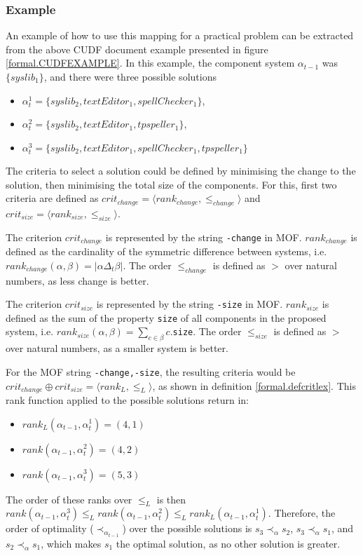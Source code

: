 \subsubsection{Example}
An example of how to use this mapping for a practical problem can be extracted from the above CUDF document example presented in figure \ref{formal.CUDFEXAMPLE}.
In this example, the component system $\alpha_{t-1}$ was  $\{syslib_1\}$, and there were three possible solutions
\begin{itemize}
  \item $\alpha_t^1 = \{syslib_2, textEditor_1, spellChecker_1\}$,
  \item $\alpha_t^2 = \{syslib_2, textEditor_1, tpspeller_1\}$,
  \item $\alpha_t^3 = \{syslib_2, textEditor_1, spellChecker_1, tpspeller_1\}$
\end{itemize}

The criteria to select a solution could be defined by minimising the change to the solution, then minimising the total size of the components.
For this, first two criteria are defined as $crit_{change} = \langle rank_{change}, \leq_{change} \rangle$ and $crit_{size} = \langle rank_{size}, \leq_{size} \rangle$.

The criterion $crit_{change}$ is represented by the string \verb+-change+ in MOF.
$rank_{change}$ is defined as the cardinality of the symmetric difference between systems, i.e. $rank_{change}(\alpha,\beta) = |\alpha \Delta_t \beta|$.
The order $\leq_{change}$ is defined as $>$ over natural numbers, as less change is better. 

The criterion $crit_{size}$ is represented by the string \verb+-size+ in MOF.
$rank_{size}$ is defined as the sum of the property \verb+size+ of all components in the  proposed system, i.e. $rank_{size}(\alpha,\beta) = \sum_{c \in \beta} c$.\verb+size+.
The order $\leq_{size}$ is defined as $>$ over natural numbers, as a smaller system is better. 

For the MOF string \verb+-change,-size+, the resulting criteria would be $crit_{change} \oplus crit_{size} = \langle rank_L, \leq_L \rangle$, as shown in definition \ref{formal.defcritlex}.
This rank function applied to the possible solutions return in:
\begin{itemize}
  \item $rank_L(\alpha_{t-1},\alpha_t^1 ) = (4, 1)$
  \item $rank(\alpha_{t-1},\alpha_t^2 ) = (4, 2)$
  \item $rank(\alpha_{t-1},\alpha_t^3 ) = (5, 3)$
\end{itemize}
The order of these ranks over $\leq_L$ is then $rank(\alpha_{t-1},\alpha_t^3) \leq_L rank(\alpha_{t-1},\alpha_t^2) \leq_L rank_L(\alpha_{t-1},\alpha_t^1)$.
Therefore, the order of optimality ($\prec_{\alpha_{t-1}}$) over the possible solutions is $s_3 \prec_{\alpha} s_2$, $s_3 \prec_{\alpha} s_1$, and $s_2 \prec_{\alpha} s_1$,
which makes $s_1$ the optimal solution, as no other solution is greater. 

